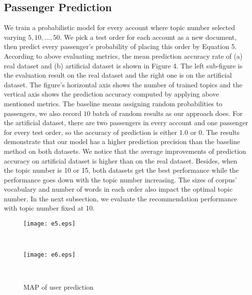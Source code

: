\documentclass{sig-alternate-05-2015}
\begin{document}
\subsection{Passenger Prediction}
We train a probabilistic model for every account where topic number selected varying ${5,10,\dots,50}$. We pick a test order for each account as a new document, then predict every passenger's probability of placing this order by Equation 5. According to above evaluating metrics, the mean prediction accuracy rate of (a) real dataset and (b) artificial dataset is shown in Figure 4. The left sub-figure is the evaluation result on the real dataset and the right one is on the artificial dataset. The figure's horizontal axis shows the number of trained topics and the vertical axis shows the prediction accuracy computed by applying above mentioned metrics. The baseline means assigning random probabilities to passengers, we also record $10$ batch of random results as our approach does. For the artificial dataset, there are two passengers in every account and one passenger for every test order, so the accuracy of prediction is either 1.0 or 0. The results demonstrate that our model has a higher prediction precision than the baseline method on both datasets. We notice that the average improvements of prediction accuracy on artificial dataset is higher than on the real dataset. Besides, when the topic number is 10 or 15, both datasets get the best performance while the performance goes down with the topic number increasing. The sizes of corpus' vocabulary and number of words in each order also impact the optimal topic number. In the next subsection, we evaluate the recommendation performance with topic number fixed at 10.\par 

\begin{figure}[!h]
              \begin{minipage}[t]{0.47\linewidth}
              \centering
              \texttt{[image: e5.eps]}\\
              \label{Price_Distribution}
              \end{minipage}
              \begin{minipage}[t]{0.005\linewidth}~~~
              \end{minipage}
              \begin{minipage}[t]{0.47\linewidth}
              \centering
              \texttt{[image: e6.eps]}\\
              \label{Departure_Time_Distribution}
              \end{minipage}
              \begin{minipage}[t]{0.005\linewidth}~~~
              \end{minipage}
              \caption{MAP of user prediction}
          \label{total_rank}
          \vspace{-0.4cm}
\end{figure}
\end{document}
